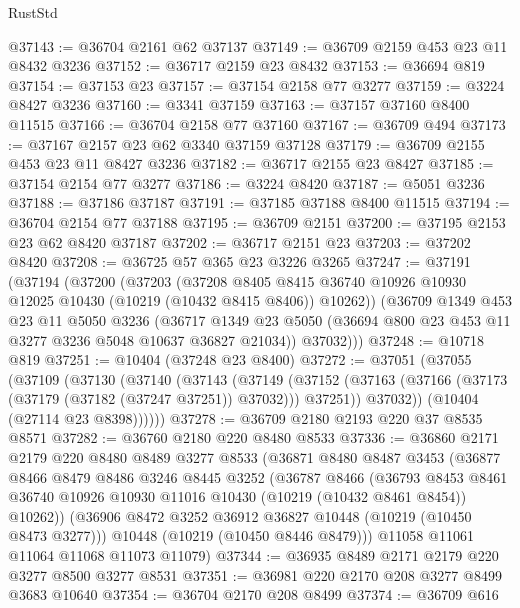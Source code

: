 \begin{lexlean}{RustStd}
\begin{coremodule}
@37143 := @36704 @2161 @62 @37137
@37149 := @36709 @2159 @453 @23 @11 @8432 @3236
@37152 := @36717 @2159 @23 @8432
@37153 := @36694 @819
@37154 := @37153 @23
@37157 := @37154 @2158 @77 @3277
@37159 := @3224 @8427 @3236
@37160 := @3341 @37159
@37163 := @37157 @37160 @8400 @11515
@37166 := @36704 @2158 @77 @37160
@37167 := @36709 @494
@37173 := @37167 @2157 @23 @62 @3340 @37159 @37128
@37179 := @36709 @2155 @453 @23 @11 @8427 @3236
@37182 := @36717 @2155 @23 @8427
@37185 := @37154 @2154 @77 @3277
@37186 := @3224 @8420
@37187 := @5051 @3236
@37188 := @37186 @37187
@37191 := @37185 @37188 @8400 @11515
@37194 := @36704 @2154 @77 @37188
@37195 := @36709 @2151
@37200 := @37195 @2153 @23 @62 @8420 @37187
@37202 := @36717 @2151 @23
@37203 := @37202 @8420
@37208 := @36725 @57 @365 @23 @3226 @3265
@37247 := @37191
    (@37194
      (@37200
        (@37203
          (@37208
            @8405
            @8415
            @36740
            @10926
            @10930
            @12025
            @10430
            (@10219 (@10432 @8415 @8406))
            @10262))
        (@36709
          @1349
          @453
          @23
          @11
          @5050
          @3236
          (@36717 @1349 @23 @5050 (@36694 @800 @23 @453 @11 @3277 @3236 @5048 @10637 @36827 @21034))
          @37032)))
@37248 := @10718 @819
@37251 := @10404 (@37248 @23 @8400)
@37272 := @37051
    (@37055
      (@37109
        (@37130
          (@37140
            (@37143
              (@37149
                (@37152 (@37163 (@37166 (@37173 (@37179 (@37182 (@37247 @37251)) @37032))) @37251))
                @37032))
            (@10404 (@27114 @23 @8398))))))
@37278 := @36709 @2180 @2193 @220 @37 @8535 @8571
@37282 := @36760 @2180 @220 @8480 @8533
@37336 := @36860
    @2171
    @2179
    @220
    @8480
    @8489
    @3277
    @8533
    (@36871
      @8480
      @8487
      @3453
      (@36877
        @8466
        @8479
        @8486
        @3246
        @8445
        @3252
        (@36787
          @8466
          (@36793
            @8453
            @8461
            @36740
            @10926
            @10930
            @11016
            @10430
            (@10219 (@10432 @8461 @8454))
            @10262))
        (@36906 @8472 @3252 @36912 @36827 @10448 (@10219 (@10450 @8473 @3277)))
        @10448
        (@10219 (@10450 @8446 @8479)))
      @11058
      @11061
      @11064
      @11068
      @11073
      @11079)
@37344 := @36935 @8489 @2171 @2179 @220 @3277 @8500 @3277 @8531
@37351 := @36981 @220 @2170 @208 @3277 @8499 @3683 @10640
@37354 := @36704 @2170 @208 @8499
@37374 := @36709
    @616

\end{coremodule}
\end{lexlean}
